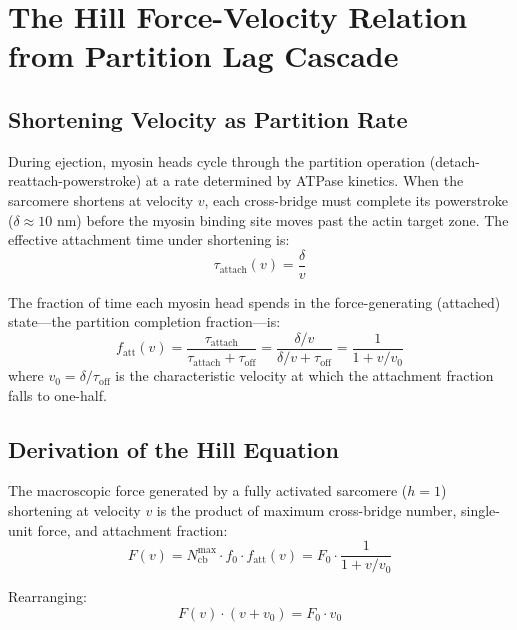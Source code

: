 \documentclass[12pt,a4paper]{article}
\theoremstyle{remark}
\newcommand{\Ncb}{N_{\mathrm{cb}}}
\begin{document}
\section{The Hill Force-Velocity Relation from Partition Lag Cascade}
\label{sec:hill}

\subsection{Shortening Velocity as Partition Rate}

During ejection, myosin heads cycle through the partition operation (detach-reattach-powerstroke) at a rate determined by ATPase kinetics. When the sarcomere shortens at velocity $v$, each cross-bridge must complete its powerstroke ($\delta \approx 10$ nm) before the myosin binding site moves past the actin target zone. The effective attachment time under shortening is:
\begin{equation}
    \tau_{\mathrm{attach}}(v) = \frac{\delta}{v}
    \label{eq:tau_attach}
\end{equation}

The fraction of time each myosin head spends in the force-generating (attached) state—the partition completion fraction—is:
\begin{equation}
    f_{\mathrm{att}}(v) = \frac{\tau_{\mathrm{attach}}}{\tau_{\mathrm{attach}} + \tau_{\mathrm{off}}} = \frac{\delta/v}{\delta/v + \tau_{\mathrm{off}}} = \frac{1}{1 + v/v_0}
    \label{eq:f_att}
\end{equation}
where $v_0 = \delta/\tau_{\mathrm{off}}$ is the characteristic velocity at which the attachment fraction falls to one-half.

\subsection{Derivation of the Hill Equation}

The macroscopic force generated by a fully activated sarcomere ($h = 1$) shortening at velocity $v$ is the product of maximum cross-bridge number, single-unit force, and attachment fraction:
\begin{equation}
    F(v) = \Ncb^{\max} \cdot f_0 \cdot f_{\mathrm{att}}(v) = F_0 \cdot \frac{1}{1 + v/v_0}
\end{equation}

Rearranging:
\begin{equation}
    F(v) \cdot (v + v_0) = F_0 \cdot v_0
\end{equation}
\end{document}
